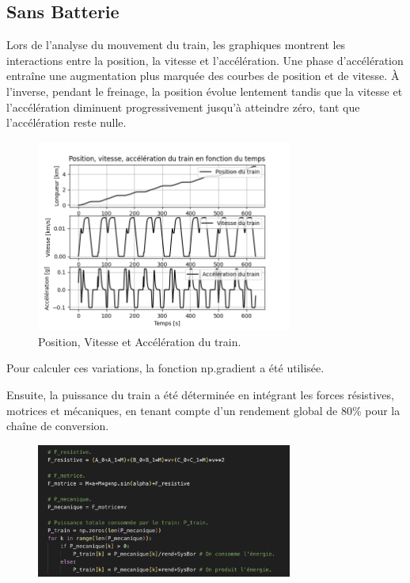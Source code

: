 \documentclass[11pt, a4paper, oneside, portrait]{report}
\begin{document}
        \subsection*{Sans Batterie}
            Lors de l’analyse du mouvement du train, les graphiques montrent les interactions entre la
            position, la vitesse et l’accélération. Une phase d’accélération entraîne une augmentation plus
            marquée des courbes de position et de vitesse. À l’inverse, pendant le freinage, la position évolue
            lentement tandis que la vitesse et l’accélération diminuent progressivement jusqu’à atteindre zéro,
            tant que l’accélération reste nulle.

            \begin{figure}[H]
                \centering
                \includegraphics[width=0.75\textwidth]{Figures/xvf.png}
                \caption{Position, Vitesse et Accélération du train.}
                \label{fig:xvf}
            \end{figure}

            Pour calculer ces variations, la fonction
            np.gradient a été utilisée.

            Ensuite, la puissance du train a été déterminée en intégrant les forces résistives, motrices et
            mécaniques, en tenant compte d’un rendement global de $80$\%{} pour la chaîne de conversion.

            \begin{figure}[H]
                \centering
                \includegraphics[width=0.75\textwidth]{Figures/AdamCode_0.png}
                \caption{}
                \label{fig:AdamCode_0}
            \end{figure}
\end{document}
